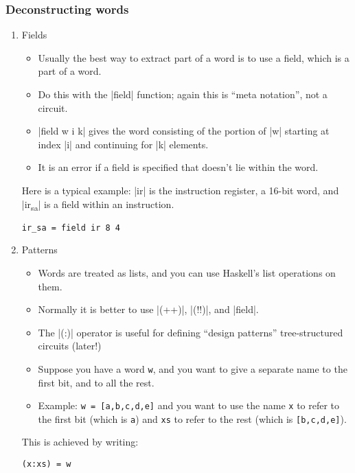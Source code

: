 \documentclass[11pt]{article}
\begin{document}
\subsubsection{Deconstructing words}
\label{sec:org41f3171}
\begin{enumerate}
\item Fields
\label{sec:org9b98cf8}

\begin{itemize}
\item Usually the best way to extract part of a word is to use a
\alert{field}, which is a part of a word.
\item Do this with the |field| function; again this is ``meta
notation'', not a circuit.
\item |field w i k| gives the word consisting of the portion of |w|
starting at index |i| and continuing for |k| elements.
\item It is an error if a field is specified that doesn't lie within
the word.
\end{itemize}

Here is a typical example: |ir| is the instruction register, a 16-bit
word, and |ir\textsubscript{sa}| is a field within an instruction.

\begin{verbatim}
ir_sa = field ir 8 4
\end{verbatim}

\item Patterns
\label{sec:orgd8a551c}

\begin{itemize}
\item Words are treated as lists, and you can use Haskell's list
operations on them.
\item Normally it is better to use |(++)|, |(!!)|, and |field|.
\item The |(:)| operator is useful for defining ``design patterns''
tree-structured circuits (later!)
\item Suppose you have a word \texttt{w}, and you want to give a
separate name to the first bit, and to all the rest.
\item Example: \texttt{w = [a,b,c,d,e]} and you want to use the
name \texttt{x} to refer to the first bit (which is \texttt{a})
and \texttt{xs} to refer to the rest (which is
\texttt{[b,c,d,e]}).
\end{itemize}

This is achieved by writing:

\begin{verbatim}
(x:xs) = w
\end{verbatim}


\end{enumerate}
\end{document}
